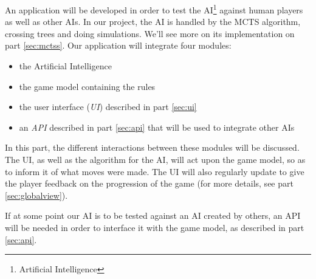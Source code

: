 An application will be developed in order to test the AI\footnote{Artificial Intelligence} against human players as well as other AIs.
In our project, the AI is handled by the MCTS algorithm, crossing trees and doing simulations. We'll see more on its implementation on part \ref{sec:mctss}.
Our application will integrate four modules: 
\begin{itemize}
\item the Artificial Intelligence
\item the game model containing the rules
\item the user interface (\emph{UI}) described in part \ref{sec:ui}
\item an \emph{API} described in part \ref{sec:api} that will be used to integrate other AIs
\end{itemize}

In this part, the different interactions between these modules will be discussed.
The UI, as well as the algorithm for the AI, will act upon the game model, so as to inform it of what moves were made.
The UI will also regularly update to give the player feedback on the progression of the game (for more details, see part \ref{sec:globalview}).

If at some point our AI is to be tested against an AI created by others, an API will be needed in order to interface it with the game model, as described in part \ref{sec:api}.
